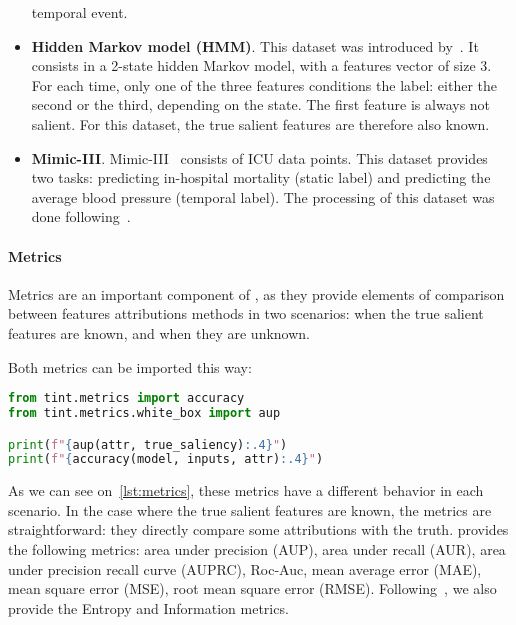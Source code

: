 \begin{itemize}
        temporal event.
    \item \textbf{Hidden Markov model (HMM)}.
        This dataset was introduced by~\citep{crabbe2021explaining}.
        It consists in a 2-state hidden Markov model, with a features vector of size 3.
        For each time, only one of the three features conditions the label: either the second or the third, depending
        on the state.
        The first feature is always not salient.
        For this dataset, the true salient features are therefore also known.
    \item \textbf{Mimic-III}.
        Mimic-III~\citep{johnson2016mimic} consists of ICU data points.
        This dataset provides two tasks: predicting in-hospital mortality (static label) and predicting the
        average blood pressure (temporal label).
        The processing of this dataset was done following~\citep{tonekaboni2020went, crabbe2021explaining}.
\end{itemize}

\paragraph{Metrics}

Metrics are an important component of \texttt{}, as they provide elements of comparison
between features attributions methods in two scenarios: when the true salient features are known, and when they are
unknown.

Both metrics can be imported this way:

\begin{lstlisting}[language=Python, caption=Attribution loading example, label={lst:metrics}]
from tint.metrics import accuracy
from tint.metrics.white_box import aup

print(f"{aup(attr, true_saliency):.4}")
print(f"{accuracy(model, inputs, attr):.4}")
\end{lstlisting}

As we can see on~\ref{lst:metrics}, these metrics have a different behavior in each scenario.
In the case where the true salient features are known, the metrics are straightforward: they directly compare some
attributions with the truth.
\texttt{} provides the following metrics: area under precision (AUP), area under recall (AUR),
area under precision recall curve (AUPRC), Roc-Auc, mean average error (MAE), mean square error (MSE), root mean square
error (RMSE).
Following~\citep{crabbe2021explaining}, we also provide the Entropy and Information metrics.

